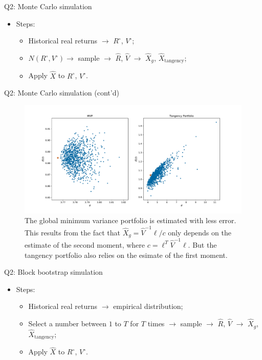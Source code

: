 \documentclass[10pt,t]{beamer}
\begin{document}
\begin{frame}{Q2: Monte Carlo simulation}
\begin{itemize}
  \item Steps:
  \begin{itemize}
    \item Historical real returns $\rightarrow$ $R^\circ$, $V^\circ$;
    \item $N(R^\circ, V^\circ) \rightarrow$ sample $\rightarrow$ $\hat{R}$, $\hat{V}$ $\rightarrow$ $\hat{X}_g$, $\hat{X}_{\text{tangency}}$;
    \item Apply $\hat{X}$ to $R^\circ$, $V^{\circ}$.
  \end{itemize}
\end{itemize}
\end{frame}

\begin{frame}{Q2: Monte Carlo simulation (cont'd)}
\begin{figure}[h!]
\centering
\includegraphics[width=\linewidth]{q2fig2.pdf}
\caption{The global minimum variance portfolio is estimated with less error. This results from the fact that $\hat{X}_g = \hat{V}^{-1} \ell / c$ only depends on the estimate of the second moment, where $c = \ell^T \hat{V}^{-1} \ell$. But the tangency portfolio also relies on the esimate of the first moment.}
\end{figure}
\end{frame}



\begin{frame}{Q2: Block bootstrap simulation}
\begin{itemize}
  \item Steps:
  \begin{itemize}
    \item Historical real returns $\rightarrow$ empirical distribution;
    \item Select a number between $1$ to $T$ for $T$ times $\rightarrow$ sample $\rightarrow$ $\hat{R}$, $\hat{V}$ $\rightarrow$ $\hat{X}_g$, $\hat{X}_{\text{tangency}}$;
    \item Apply $\hat{X}$ to $R^\circ$, $V^{\circ}$.
  \end{itemize}
\end{itemize}
\end{frame}
\end{document}
